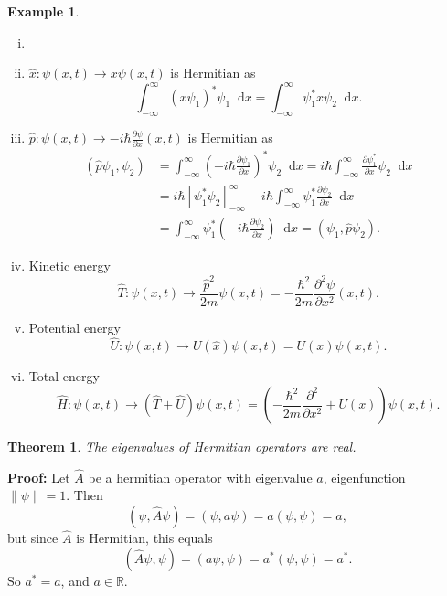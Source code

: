 \documentclass[12pt]{article}
\newcommand{\diff}{\mathop{}\!\mathrm{d}}
\newtheorem{theorem}{Theorem}[section]
\theoremstyle{definition}
\newtheorem{example}{Example}[section]
\theoremstyle{remark}
\begin{document}
\begin{adjustbox}{minipage = \columnwidth - 25.5pt, margin=1em, frame=1pt, margin=0em}
\begin{example}
	\begin{enumerate}[(i)]
		\item[]
		\item $\hat x : \psi(x, t) \to x \psi(x, t)$ is Hermitian as
			\[
				\int_{-\infty}^{\infty}(x\psi_1)^{\ast}\psi_1\diff x = \int_{-\infty}^{\infty}\psi_1^{\ast} x \psi_2 \diff x
			.\]
		\item $\hat p : \psi(x, t) \to -i\hbar \frac{\partial \psi}{\partial x}(x, t)$ is Hermitian as
			\begin{align*}
				(\hat p \psi_1, \psi_2) &= \int_{-\infty}^{\infty} \left(-i\hbar \frac{\partial \psi_1}{\partial x}\right)^{\ast} \psi_2 \diff x = i \hbar \int_{-\infty}^{\infty}\frac{\partial \psi_1^{\ast}}{\partial x}\psi_2 \diff x \\
							&= i \hbar \left[\psi_1^{\ast} \psi_2\right]_{-\infty}^{\infty} - i \hbar \int_{-\infty}^{\infty} \psi_1^{\ast} \frac{\partial \psi_2}{\partial x}\diff x \\
							&= \int_{-\infty}^{\infty} \psi_1^{\ast} \left(-i\hbar \frac{\partial \psi_2}{\partial x}\right) \diff x = (\psi_1, \hat p \psi_2).
			\end{align*}
		\item Kinetic energy
			\[
				\hat T : \psi(x, t) \to \frac{\hat p^2}{2m} \psi(x, t) = - \frac{\hbar^2}{2m} \frac{\partial^2 \psi}{\partial x^2}(x, t)
			.\]
		\item Potential energy
			\[
				\hat U : \psi(x, t) \to U(\hat x)\psi(x, t) = U(x)\psi(x, t)
			.\]
		\item Total energy
			\[
				\hat H : \psi(x, t) \to (\hat T + \hat U)\psi(x, t) = \left(- \frac{\hbar^2}{2m} \frac{\partial^2}{\partial x^2} + U(x) \right) \psi(x, t)
			.\]
	\end{enumerate}
	
\end{example}

\end{adjustbox}


\begin{theorem}
	The eigenvalues of Hermitian operators are real.
\end{theorem}

\begin{adjustbox}{minipage = \columnwidth - 25.5pt, margin=1em, frame=1pt, margin=0em}
\textbf{Proof:} Let $\hat A$ be a hermitian operator with eigenvalue $a$, eigenfunction $\|\psi\| = 1$. Then
\[
	(\psi, \hat A \psi) = (\psi, a \psi) = a(\psi, \psi) = a
,\]
but since $\hat A$ is Hermitian, this equals
\[
	(\hat A \psi, \psi) = (a \psi, \psi) = a^{\ast} (\psi, \psi) = a^{\ast}
.\]
So $a^{\ast} = a$, and $a \in \mathbb{R}$.
\end{adjustbox}
\end{document}
